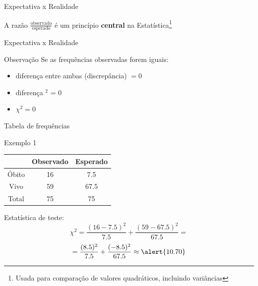 \documentclass{beamer}
\begin{document}
\begin{frame}{\small Expectativa x Realidade}
  \begin{center}
    \small
    A razão $\frac{\text{observado}}{\text{esperado}}$ é um princípio {\bf central} na Estatística\footnote{\scriptsize Usada para comparação de valores quadráticos, incluindo variâncias}
  \end{center}
\end{frame}

\begin{frame}{\small Expectativa x Realidade}
  \begin{block}{Observação}
    \scriptsize
    Se as frequências observadas forem iguais:
    \bigskip
    \begin{itemize}
    \footnotesize
    \item diferença entre ambas (discrepância) $= 0$
    \item diferença $^2$ = 0
    \item $\chi^2 = 0$
    \end{itemize}
    \bigskip
  \end{block}
\end{frame}

\begin{frame}{\scriptsize Tabela de frequências}
  \begin{exampleblock}{Exemplo 1}
    \footnotesize
    \begin{tabular}{c|c|c}
      & Observado & Esperado\\
      \hline
      Óbito & 16 & 7.5 \\
      \hline
      Vivo & 59 & 67.5 \\
      \hline
      Total & 75 & 75\\
    \end{tabular}
  \end{exampleblock}

  Estatística de teste:
  \small
  \begin{displaymath}
    \chi^2 = \frac{(16 - 7.5)^2}{7.5} + \frac{(59 - 67.5)^2}{67.5} =
  \end{displaymath}
  \begin{displaymath}
    = \frac{(8.5)^2}{7.5} + \frac{(-8.5)^2}{67.5} \approx \alert{10.70}
  \end{displaymath}
\end{frame}
\end{document}
